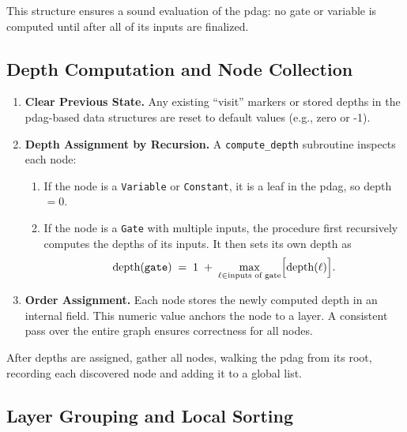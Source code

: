 This structure ensures a sound evaluation of the \acrshort{pdag}: no gate or variable is computed until after all of its inputs are finalized.

\subsection{Depth Computation and Node Collection}

\begin{enumerate}
    \item \textbf{Clear Previous State.}  
      Any existing “visit” markers or stored depths in the \acrshort{pdag}-based data structures are reset to default values (e.g., zero or -1).
      
    \item \textbf{Depth Assignment by Recursion.}  
      A \texttt{compute\_depth} subroutine inspects each node:
      \begin{enumerate}
        \item If the node is a \texttt{Variable} or \texttt{Constant}, it is a leaf in the \acrshort{pdag}, so depth \(=0\).  
        \item If the node is a \texttt{Gate} with multiple inputs, the procedure first recursively computes the depths of its inputs. It then sets its own depth as 
        \[
          \text{depth}(\texttt{gate})
          \;=\;
          1 \;+\;\max\limits_{\ell \in \text{inputs of gate}} \Bigl[\text{depth}(\ell)\Bigr].
        \]
      \end{enumerate}
    \item \textbf{Order Assignment.}  
      Each node stores the newly computed depth in an internal field. This numeric value anchors the node to a layer. A consistent pass over the entire graph ensures correctness for all nodes.
\end{enumerate}

After depths are assigned, gather all nodes, walking the \acrshort{pdag} from its root, recording each discovered node and adding it to a global list.

\subsection{Layer Grouping and Local Sorting}

